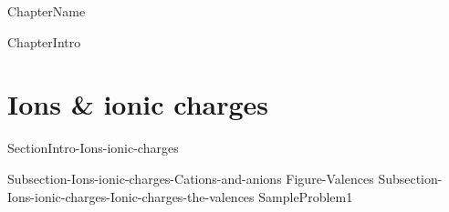 \documentclass[main.tex]{subfiles}
\newcommand\chapterlabel{Ch-naming}\setcounter{figurenewcounter}{0}\setcounter{tablenewcounter}{0}\setcounter{formulanewcounter}{0}\chapterpicture{../{\chapterlabel}/figure1}\chapterpicturelabel{Pixnio}
\begin{document}
{ChapterName}


   
   
{ChapterIntro}

%
%

\section{Ions \& ionic charges}
{SectionIntro-Ions-ionic-charges}
\sloppy\begin{description}
{Subsection-Ions-ionic-charges-Cations-and-anions}
{Figure-Valences}
{Subsection-Ions-ionic-charges-Ionic-charges-the-valences}
{SampleProblem1}
\end{description}
\end{document}

